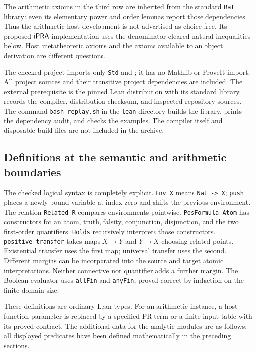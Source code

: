 The arithmetic axioms in the third row are inherited from the standard
\texttt{Rat} library: even its elementary power and order lemmas report
those dependencies. Thus the arithmetic host development is not advertised
as choice-free. Its proposed \(\mathsf{iPRA}\) implementation uses the
denominator-cleared natural inequalities below. Host metatheoretic axioms
and the axioms available to an object derivation are different questions.

The checked project imports only \texttt{Std} and
; it has no Mathlib or ProveIt import.
All project sources and their transitive project dependencies are included.
The external prerequisite is the pinned Lean distribution with its standard
library.  records the compiler, distribution
checksum, and inspected repository sources. The command
\texttt{bash replay.sh} in the \texttt{lean} directory builds the library,
prints the dependency audit, and checks the examples. The compiler itself
and disposable build files are not included in the archive.

\subsection{Definitions at the semantic and arithmetic boundaries}

The checked logical syntax is completely explicit.
\texttt{Env X} means \texttt{Nat -> X}; \texttt{push} places a newly bound
variable at index zero and shifts the previous environment. The relation
\texttt{Related R} compares environments pointwise.
\texttt{PosFormula Atom} has constructors for an atom, truth, falsity,
conjunction, disjunction, and the two first-order quantifiers.
\texttt{Holds} recursively interprets those constructors.
\texttt{positive\_transfer} takes maps \(X\to Y\) and \(Y\to X\)
choosing related points. Existential transfer uses the first map;
universal transfer uses the second. Different margins can be incorporated
into the source and target atomic interpretations. Neither connective nor
quantifier adds a further margin. The Boolean evaluator uses
\texttt{allFin} and \texttt{anyFin}, proved correct by induction on the
finite domain size.

These definitions are ordinary Lean types. For an arithmetic instance, a
host function parameter is replaced by a specified PR term or a finite
input table with its proved contract. The additional data for the analytic
modules are as follows; all displayed predicates have been defined
mathematically in the preceding sections.


